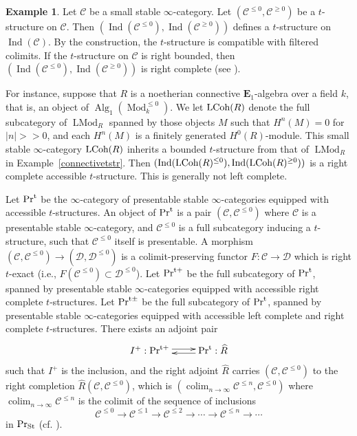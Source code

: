 \documentclass[leqno,12pt]{amsart}
\theoremstyle{plain}
\theoremstyle{definition}
\newtheorem{Example}[Theorem]{Example}
\newcommand{\DDD}{\mathcal{D}}
\newcommand{\CCC}{\mathcal{C}}
\newcommand{\PR}{\textup{Pr}}
\newcommand{\PRT}{\textup{Pr}^{\textup{t}}}
\newcommand{\PRTT}{\textup{Pr}^{\textup{t}+}}
\newcommand{\PRTTT}{\textup{Pr}^{\textup{t}\pm}}
\newcommand{\Mod}{\operatorname{Mod}}
\newcommand{\colim}{\operatorname{colim}}
\newcommand{\Alg}{\operatorname{Alg}}
\newcommand{\Ind}{\operatorname{Ind}}
\newcommand{\PRST}{\PR_{\textup{St}}}
\newcommand{\eone}{\mathbf{E}_1}
\newcommand{\LMod}{\operatorname{LMod}}
\begin{document}
\begin{Example}
\label{Indtstr}
Let $\CCC$ be a small stable $\infty$-category.
Let $(\CCC^{\le0}, \CCC^{\ge0})$ be a $t$-structure on $\CCC$.
Then $(\Ind(\CCC^{\le0}),\Ind(\CCC^{\ge0}))$ defines a $t$-structure on $\Ind(\CCC)$.
By the construction, the $t$-structure is compatible with filtered colimits.
If the $t$-structure on $\CCC$ is right bounded, then 
$(\Ind(\CCC^{\le0}),\Ind(\CCC^{\ge0}))$ is right complete (see \cite[VIII, Lemma 5.4.1]{DAG}).

For instance, suppose that $R$ is a noetherian connective $\eone$-algebra over a field $k$, 
that is, an object of $\Alg_1(\Mod_k^{\le0})$.
We let $\textup{LCoh}(R)$ denote the full subcategory of $\LMod_R$ spanned by those objects $M$
such that $H^n(M)=0$ for $|n|>>0$, and each $H^n(M)$ is a finitely generated $H^0(R)$-module.
This small stable $\infty$-category $\textup{LCoh}(R)$ inherits a bounded $t$-structure from that of $\LMod_R$ in Example~\ref{connectivetstr}.
Then $(\Ind(\textup{LCoh}(R)^{\le0}),\Ind(\textup{LCoh}(R)^{\ge0}))$ 
is a right complete accessible $t$-structure. This is generally not left complete.
\end{Example}






Let $\PRT$ be the $\infty$-category of presentable stable $\infty$-categories equipped with accessible $t$-structures.
An object of $\PRT$ is a pair $(\CCC,\CCC^{\le0})$ where $\CCC$ is a presentable stable $\infty$-category, and $\CCC^{\le0}$ is a  full subcategory
inducing a $t$-structure,
such that $\CCC^{\le0}$ itself is presentable.
A morphism $(\CCC, \CCC^{\le0})\to (\DDD,\DDD^{\le0})$ is a colimit-preserving functor $F:\CCC\to  \DDD$ which is right $t$-exact (i.e., $F(\CCC^{\le0})\subset \DDD^{\le0}$).
Let $\PRTT$ be the full subcategory of $\PRT$, spanned by presentable stable $\infty$-categories equipped with accessible right complete $t$-structures.
Let $\PRTTT$ be the full subcategory of $\PRT$, spanned by presentable stable $\infty$-categories equipped with accessible left complete and right complete $t$-structures.
There exists an adjoint pair
\[
\xymatrix{
I^+: \PRTT \ar@<0.5ex>[r] &  \PRT:\widehat{R}  \ar@<0.5ex>[l]  
}
\]
such that $I^+$ is the inclusion, and the right adjoint $\widehat{R}$ carries $(\CCC,\CCC^{\le0})$
to the right completion $\widehat{R}(\CCC,\CCC^{\le0})$, which is
$(\colim_{n\to \infty} \CCC^{\le n},\CCC^{\le0})$
where $\colim_{n\to \infty} \CCC^{\le n}$ is the colimit of the sequence of inclusions
\[
\CCC^{\le 0}\to \CCC^{\le 1}\to \CCC^{\le 2}\to \cdots\to \CCC^{\le n}\to \cdots
\]
in $\PRST$
(cf. \cite[5.5.3.4, 5.5.3.18]{HTT}). 
\end{document}
